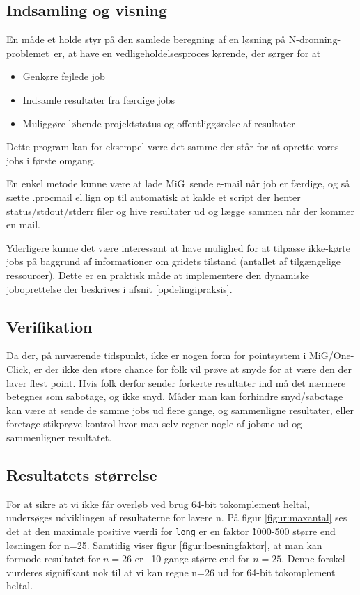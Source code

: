 \documentclass[draft,a4paper,11pt]{article}
\newcommand{\mig}{MiG}
\newcommand{\oc}{One-Click}
\newcommand{\nq}{N-dronning-problemet}
\begin{document}
\subsection{Indsamling og visning}
En måde et holde styr på den samlede beregning af en løsning på \nq\ er, at have en vedligeholdelsesproces kørende, der sørger for at 
\begin{itemize}
	\item Genkøre fejlede job
	\item Indsamle resultater fra færdige jobs
	\item Muliggøre løbende projektstatus og offentliggørelse af resultater 
\end{itemize}
Dette program kan for eksempel være det samme der står for at oprette vores jobs i første omgang. 

En enkel metode kunne være at lade \mig\ sende e-mail når job er færdige, og så sætte .procmail el.lign op til automatisk at kalde et script der henter status/stdout/stderr filer og hive resultater ud og lægge sammen når der
kommer en mail.

Yderligere kunne det være interessant at have mulighed for at tilpasse ikke-kørte jobs på baggrund af informationer om gridets tilstand (antallet af tilgængelige ressourcer). Dette er en praktisk måde at implementere den dynamiske joboprettelse der beskrives i afsnit \ref{opdelingipraksis}. 

\subsection{Verifikation}
Da der, på nuværende tidspunkt, ikke er nogen form for pointsystem i \mig/\oc,
er der ikke den store chance for folk vil prøve at snyde for at være den der
laver flest point. Hvis folk derfor sender forkerte resultater ind må det
nærmere betegnes som sabotage, og ikke snyd. Måder man kan forhindre
snyd/sabotage kan være at sende de samme jobs ud flere gange, og sammenligne
resultater, eller foretage stikprøve kontrol hvor man selv regner nogle af
jobsne ud og sammenligner resultatet. 

\subsection{Resultatets størrelse}
For at sikre at vi ikke får overløb ved brug 64-bit tokomplement heltal, undersøges udviklingen af resultaterne for lavere n.
På figur \ref{figur:maxantal} ses det at den maximale positive værdi for \texttt{long} er en faktor \~1000-500  større end løsningen for n=25. Samtidig viser figur \ref{figur:loesningfaktor}, at man kan formode resultatet for $n=26$ er ~10 gange større end for $n=25$. Denne forskel vurderes signifikant nok til at vi kan regne n=26 ud for 64-bit tokomplement heltal.
\end{document}
